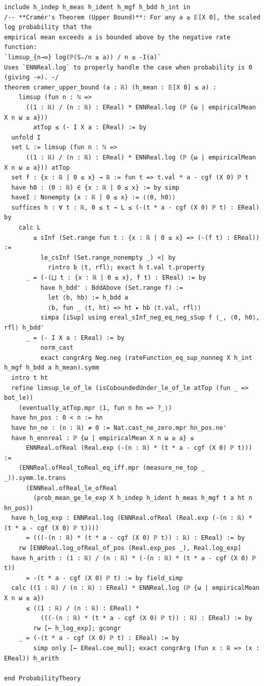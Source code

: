 \begin{lstlisting}
include h_indep h_meas h_ident h_mgf h_bdd h_int in
/-- **Cramér's Theorem (Upper Bound)**: For any a ≥ 𝔼[X 0], the scaled log probability that the
empirical mean exceeds a is bounded above by the negative rate function:
`limsup_{n→∞} log(ℙ(Sₙ/n ≥ a)) / n ≤ -I(a)`
Uses `ENNReal.log` to properly handle the case when probability is 0 (giving -∞). -/
theorem cramer_upper_bound (a : ℝ) (h_mean : 𝔼[X 0] ≤ a) :
    limsup (fun n : ℕ =>
      ((1 : ℝ) / (n : ℝ) : EReal) * ENNReal.log (ℙ {ω | empiricalMean X n ω ≥ a}))
        atTop ≤ (- I X a : EReal) := by
  unfold I
  set L := limsup (fun n : ℕ =>
      ((1 : ℝ) / (n : ℝ) : EReal) * ENNReal.log (ℙ {ω | empiricalMean X n ω ≥ a})) atTop
  set f : {x : ℝ | 0 ≤ x} → ℝ := fun t => t.val * a - cgf (X 0) ℙ t
  have h0 : (0 : ℝ) ∈ {x : ℝ | 0 ≤ x} := by simp
  haveI : Nonempty {x : ℝ | 0 ≤ x} := ⟨⟨0, h0⟩⟩
  suffices h : ∀ t : ℝ, 0 ≤ t → L ≤ (-(t * a - cgf (X 0) ℙ t) : EReal) by
    calc L
        ≤ sInf (Set.range fun t : {x : ℝ | 0 ≤ x} => (-(f t) : EReal)) :=
          le_csInf (Set.range_nonempty _) <| by
            rintro b ⟨t, rfl⟩; exact h t.val t.property
      _ = (-(⨆ t : {x : ℝ | 0 ≤ x}, f t) : EReal) := by
          have h_bdd' : BddAbove (Set.range f) :=
            let ⟨b, hb⟩ := h_bdd a
            ⟨b, fun _ ⟨t, ht⟩ => ht ▸ hb ⟨t.val, rfl⟩⟩
          simpa [iSup] using ereal_sInf_neg_eq_neg_sSup f ⟨_, ⟨0, h0⟩, rfl⟩ h_bdd'
      _ = (- I X a : EReal) := by
          norm_cast
          exact congrArg Neg.neg (rateFunction_eq_sup_nonneg X h_int h_mgf h_bdd a h_mean).symm
  intro t ht
  refine limsup_le_of_le (isCoboundedUnder_le_of_le atTop (fun _ => bot_le))
    (eventually_atTop.mpr ⟨1, fun n hn => ?_⟩)
  have hn_pos : 0 < n := hn
  have hn_ne : (n : ℝ) ≠ 0 := Nat.cast_ne_zero.mpr hn_pos.ne'
  have h_ennreal : ℙ {ω | empiricalMean X n ω ≥ a} ≤
      ENNReal.ofReal (Real.exp (-(n : ℝ) * (t * a - cgf (X 0) ℙ t))) :=
    (ENNReal.ofReal_toReal_eq_iff.mpr (measure_ne_top _ _)).symm.le.trans
      (ENNReal.ofReal_le_ofReal
        (prob_mean_ge_le_exp X h_indep h_ident h_meas h_mgf t a ht n hn_pos))
  have h_log_exp : ENNReal.log (ENNReal.ofReal (Real.exp (-(n : ℝ) * (t * a - cgf (X 0) ℙ t))))
      = (((-(n : ℝ) * (t * a - cgf (X 0) ℙ t)) : ℝ) : EReal) := by
    rw [ENNReal.log_ofReal_of_pos (Real.exp_pos _), Real.log_exp]
  have h_arith : (1 : ℝ) / (n : ℝ) * (-(n : ℝ) * (t * a - cgf (X 0) ℙ t))
      = -(t * a - cgf (X 0) ℙ t) := by field_simp
  calc ((1 : ℝ) / (n : ℝ) : EReal) * ENNReal.log (ℙ {ω | empiricalMean X n ω ≥ a})
      ≤ ((1 : ℝ) / (n : ℝ) : EReal) *
          (((-(n : ℝ) * (t * a - cgf (X 0) ℙ t)) : ℝ) : EReal) := by
        rw [← h_log_exp]; gcongr
    _ = (-(t * a - cgf (X 0) ℙ t) : EReal) := by
        simp only [← EReal.coe_mul]; exact congrArg (fun x : ℝ => (x : EReal)) h_arith

end ProbabilityTheory
\end{lstlisting}

